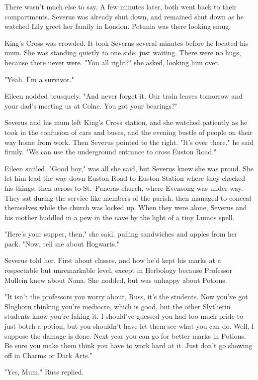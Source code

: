 There wasn't much else to say. A few minutes later, both went back to their compartments. Severus was already shut down, and remained shut down as he watched Lily greet her family in London. Petunia was there looking smug.

King's Cross was crowded. It took Severus several minutes before he located his mum. She was standing quietly to one side, just waiting. There were no hugs, because there never were. "You all right?" she asked, looking him over.

"Yeah. I'm a survivor."

Eileen nodded brusquely. "And never forget it. Our train leaves tomorrow and your dad's meeting us at Colne. You got your bearings?"

Severus and his mum left King's Cross station, and she watched patiently as he took in the confusion of cars and buses, and the evening bustle of people on their way home from work. Then Severus pointed to the right. "It's over there," he said firmly. "We can use the underground entrance to cross Euston Road."

Eileen smiled. "Good boy," was all she said, but Severus knew she was proud. She let him lead the way down Euston Road to Euston Station where they checked his things, then across to St.~Pancras church, where Evensong was under way. They sat during the service like members of the parish, then managed to conceal themselves while the church was locked up. When they were alone, Severus and his mother huddled in a pew in the nave by the light of a tiny Lumos spell.

"Here's your supper, then," she said, pulling sandwiches and apples from her pack. "Now, tell me about Hogwarts."

Severus told her. First about classes, and how he'd kept his marks at a respectable but unremarkable level, except in Herbology because Professor Mullein knew about Nana. She nodded, but was unhappy about Potions.

"It isn't the professors you worry about, Russ, it's the students. Now you've got Slughorn thinking you're mediocre, which is good, but the other Slytherin students know you're faking it. I should've guessed you had too much pride to just botch a potion, but you shouldn't have let them see what you can do. Well, I suppose the damage is done. Next year you can go for better marks in Potions. Be sure you make them think you have to work hard at it. Just don't go showing off in Charms or Dark Arts."

"Yes, Mum," Russ replied.

